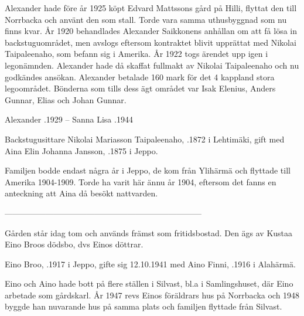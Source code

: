 Alexander hade före år 1925 köpt Edvard Mattssons gård på Hilli, flyttat den till Norrbacka och använt den som stall. Torde vara samma uthusbyggnad som nu finns kvar. År 1920 behandlades Alexander Saikkonens anhållan om att få lösa in backstuguområdet, men avslogs eftersom kontraktet blivit upprättat med Nikolai Taipaleenaho, som befann sig i Amerika. År 1922 togs ärendet upp igen i legonämnden. Alexander hade då skaffat fullmakt av Nikolai Taipaleenaho och nu godkändes ansökan. Alexander betalade 160 mark för det 4 kappland stora legoområdet. Bönderna som tills dess ägt området var Isak Elenius, Anders Gunnar, Elias och Johan Gunnar.

Alexander .1929  --  Sanna Lisa .1944


Backstugusittare Nikolai Mariasson Taipaleenaho, .1872 i Lehtimäki, gift med Aina Elin Johanna Jansson, .1875 i Jeppo.
\begin{jhchildren}
  \item {}
  \item {}
  \item {}
\end{jhchildren}
Familjen bodde endast några år i Jeppo, de kom från Ylihärmä och flyttade till Amerika 1904-1909. Torde ha varit här ännu år 1904, eftersom det fanns en anteckning att Aina då besökt nattvarden.


------------------------------------------------------------------------


Gården står idag tom och används främst som fritidsbostad. Den ägs av Kustaa Eino Broos dödsbo, dvs Einos döttrar.


Eino Broo, .1917 i Jeppo, gifte sig 12.10.1941 med Aino Finni, .1916 i Alahärmä.
\begin{jhchildren}
  \item {}
  \item {}
  \item {}
  \item {}
\end{jhchildren}
Eino och Aino hade bott på flere ställen i Silvast, bl.a i Samlingshuset, där Eino arbetade som gårdskarl. År 1947 revs Einos föräldrars hus på Norrbacka och 1948 byggde han nuvarande hus på samma plats och familjen flyttade från Silvast.

